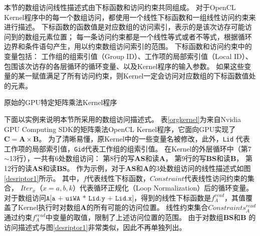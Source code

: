 本节的数组访问线性描述式由下标函数和访问约束共同组成。
对于OpenCL Kernel程序中的每一个数组访问，都使用一个线性下标函数和一组线性访问约束来进行描述。
下标函数的函数值是对应数组的访问索引，表示的是该次访存可能访问到的数组元素位置；
每一条访问约束都是一个线性等式或者不等式，根据循环边界和条件语句产生，用以约束数组访问索引的范围。
下标函数和访问约束中的变量包括：
工作组的组索引值（Group ID）、工作项的局部索引值（Local ID）、包围该次访存的各层循环的循环变量、以及Kernel程序的输入参数。
如果这些变量的某一赋值满足了所有访问约束，则Kernel一定会访问对应数组的下标函数值处的元素。

\begin{table}[htb]
	\centering
	\caption{原始的GPU特定矩阵乘法Kernel程序}
	\label{orgkernel}
\end{table}

下面以实例来说明本节所采用的数组访问描述式。
表\ref{orgkernel}为来自Nvidia GPU Computing SDK的矩阵乘法OpenCL Kernel程序，它面向GPU实现了$\bm{C}=\bm{A}\times \bm{B}$。
为了清晰易懂，原Kernel中的一些变量名被修改，此外，{\tt Lid} 代表工作项的局部索引值，{\tt Gid}代表工作组的组索引值。
在Kernel的外层循环中（第7$\sim$13行），一共有6处数组访问：
第8行的写$\bm{AS}$和读$\bm{A}$，
第9行的写$\bm{BS}$和读$\bm{B}$，
第12行的读$\bm{AS}$和读$\bm{BS}$。
作为示例，对于$\bm{AS}$和$\bm{A}$的3处数组访问的线性描述式如图\ref{desriptor1}所示。
其中，$f$代表线性下标函数，$Constraint$代表线性访问约束的集合，
$Iter_x$（$x = a, b, k$）代表循环正规化（Loop Normalization）后的循环变量。
对于数组访问$\texttt{A[a + uiWA * Lid.y + Lid.x]}$，得到的线性下标函数是$f^{read}_{A}$，其值覆盖了Kernel执行时对数组$\bm{A}$的所有可能的访问位置。
线性约束集合$Constraints^{read}_{A}$通过约束$f^{read}_{A}$中变量的取值，限制了上述访问位置的范围。
由于对数组$\bm{BS}$和$\bm{B}$ 的访问描述式与图\ref{desriptor1}非常类似，因此不再单独列出。

